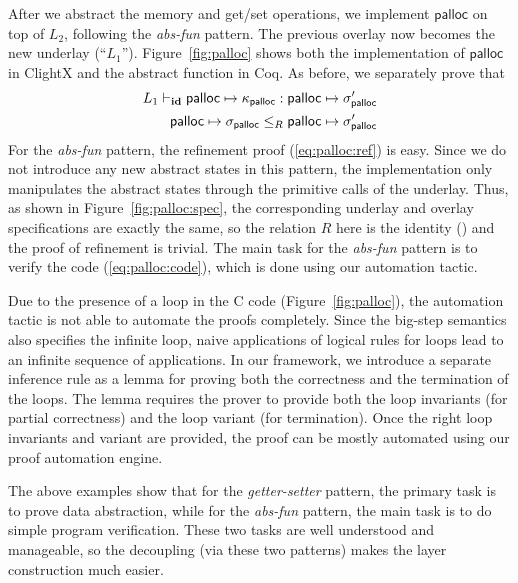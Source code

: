 After we abstract the memory and get/set operations,
we implement $\textsf{palloc}$ on top of $L_2$,
following the {\it abs-fun} pattern.
The previous overlay now becomes the new underlay (``$L_1$'').
Figure~\ref{fig:palloc} shows both the implementation of
$\textsf{palloc}$ in ClightX and the abstract function in Coq.
As before, we separately prove that
\begin{align}
\ltyp{L_1}{\id}%
	{\textsf{palloc} \mapsto \kappa_\textsf{palloc}}%
	{\textsf{palloc} \mapsto \sigma'_\textsf{palloc}}
	\label{eq:palloc:code}
\\
\textsf{palloc} \mapsto \sigma_\textsf{palloc}\lpath{R}
\textsf{palloc} \mapsto \sigma'_\textsf{palloc}
\label{eq:palloc:ref}
\end{align}%
For the {\it abs-fun} pattern, the refinement proof 
(\ref{eq:palloc:ref}) is easy.
Since we do not introduce any new abstract states in this pattern,
the implementation only manipulates the abstract states through the
primitive calls of the underlay. Thus, as shown in 
Figure~\ref{fig:palloc:spec},
the corresponding underlay and overlay specifications are exactly the same,
so the relation $R$ here is the identity (\id) and 
the proof of refinement is trivial.
The main task for the {\it abs-fun}
pattern is to verify the code
(\ref{eq:palloc:code}), which is done using our automation tactic. 


Due to the presence of a loop in the C code (\cf Figure~\ref{fig:palloc}), 
the automation tactic is not able to automate the proofs completely.
Since the big-step semantics also specifies the infinite loop,
naive applications of logical rules  for loops
lead to an infinite sequence of applications.
In our framework, we introduce a separate inference rule as a
lemma for proving both the correctness and the termination of the loops.
The lemma requires the prover to provide both the loop invariants
(for partial correctness) and the loop variant (for termination).
Once the right loop invariants and variant are provided, the proof
can be mostly automated using our proof automation engine.


The above examples show that for the {\it getter-setter} pattern, the
primary task is to prove data abstraction, while for the {\it abs-fun}
pattern, the main task is to do simple program verification.  These
two tasks are well understood and manageable, so the decoupling (via
these two patterns) makes the layer construction much easier. 


